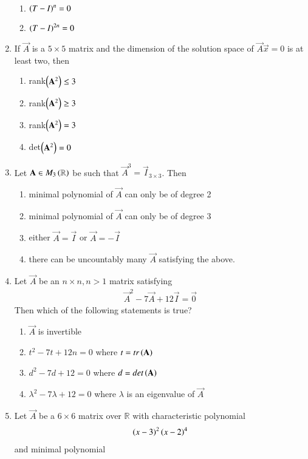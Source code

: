 \begin{enumerate}[label=\thesection.\arabic*.,ref=\thesection.\theenumi]
\begin{enumerate}
\item $\left(T-I\right)^{n} = 0$ 
\item $\left(T-I\right)^{2n} = 0$ 
\end{enumerate}
%
\item If $\vec{A}$ is a $5\times 5$ matrix and the dimension of the solution space of $\vec{A}\vec{x} = 0$ is at least two, then
\begin{enumerate}
\item rank$\left(\mathbf{A}^2\right) \le 3$ 
\item rank$\left(\mathbf{A}^2\right) \ge 3$ 
\item rank$\left(\mathbf{A}^2\right) = 3$ 
\item det$\left(\mathbf{A}^2\right) = 0$ 
\end{enumerate}
%
\item Let $\mathbf{A} \in M_3\left(\mathbb{R}\right)$ be such that $\vec{A}^3 = \vec{I}_{3\times 3}$.  Then
\begin{enumerate}
\item minimal polynomial of $\vec{A}$ can only be of degree 2
\item minimal polynomial of $\vec{A}$ can only be of degree 3
\item either $\vec{A} = \vec{I}$ or $\vec{A} = -\vec{I}$
\item there can be uncountably many $\vec{A}$ satisfying the above.
\end{enumerate}
%
\item Let $\vec{A}$ be an $n \times n, n > 1$ matrix satisfying
\begin{align}
\vec{A}^2 - 7\vec{A} + 12\vec{I} = \vec{0}
\end{align}
%
Then which of the following statements is true?
\begin{enumerate}
\item  $\vec{A}$ is invertible
\item $t^2-7t+12n = 0$ where $t = tr\left(\mathbf{A}\right)$
\item $d^2-7d+12 = 0$ where $d = det\left(\mathbf{A}\right)$
\item $\lambda^2-7\lambda+12 = 0$ where $\lambda$ is an eigenvalue of $\vec{A}$
\end{enumerate}
%
\solution

\item Let $\vec{A}$ be a $6 \times 6$ matrix over $\mathbb{R}$ with characteristic polynomial
%
\begin{align}
\left(x-3\right)^2
\left(x-2\right)^4
\end{align}
%
and minimal polynomial
%
\begin{align}

\end{align}
\end{enumerate}
